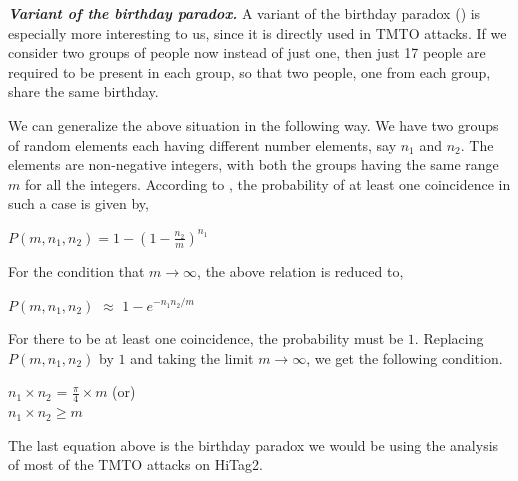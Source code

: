 \textit{\textbf{Variant of the birthday paradox.}} A variant of the birthday paradox (\cite{GeneralizedAttack}) is especially more interesting to us, since it is directly used in TMTO attacks. If we consider two groups of people now instead of just one, then just 17 people are required to be present in each group, so that two people, one from each group, share the same birthday.  

We can generalize the above situation in the following way. We have two groups of random elements each having different number elements, say $n_1$ and $n_2$. The elements are non-negative integers, with both the groups having the same range $m$ for all the integers. According to \cite{menezes}, the probability of at least one coincidence in such a case is given by,
\begin{center}
\large{$P(m, n_1, n_2) = 1 -(1 -\frac{n_2}{m})^{n_1}$}
\end{center}

For the condition that $m \rightarrow \infty$, the above relation is reduced to,
\begin{center}
\large{$P(m, n_1, n_2)$ $\approx$ $1 - e^{-{n_{1} n_{2}}/{m}}$}
\end{center}

For there to be at least one coincidence, the probability must be $1$. Replacing $P(m, n_1, n_2)$ by $1$ and taking the limit $m \rightarrow \infty$, we get the following condition.
\begin{center}
\large{$n_1 \times n_2$ = $\frac{\pi}{4} \times m$ (or)\\}
\large{$n_1 \times n_2 \geq m$}
\end{center}

The last equation above is the birthday paradox we would be using the analysis of most of the TMTO attacks on HiTag2.







